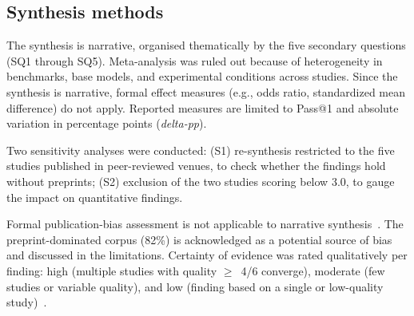 \subsection{Synthesis methods}
\label{sec:sintese}

The synthesis is narrative, organised thematically by the five secondary
questions (SQ1 through SQ5).
Meta-analysis was ruled out because of heterogeneity in benchmarks,
base models, and experimental conditions across studies.
Since the synthesis is narrative, formal effect measures (e.g., odds
ratio, standardized mean difference) do not apply.
Reported measures are limited to Pass@1 and absolute variation in
percentage points (\textit{delta-pp}).

Two sensitivity analyses were conducted:
(S1) re-synthesis restricted to the five studies published in
peer-reviewed venues, to check whether the findings hold without
preprints;
(S2) exclusion of the two studies scoring below 3.0, to gauge the
impact on quantitative findings.

Formal publication-bias assessment is not applicable to narrative
synthesis~\citep{page2021prisma}.
The preprint-dominated corpus (82\%) is acknowledged as a potential
source of bias and discussed in the limitations.
Certainty of evidence was rated qualitatively per finding:
high (multiple studies with quality $\geq$~4/6 converge),
moderate (few studies or variable quality), and
low (finding based on a single or low-quality
study)~\citep{kitchenham2023segress}.
